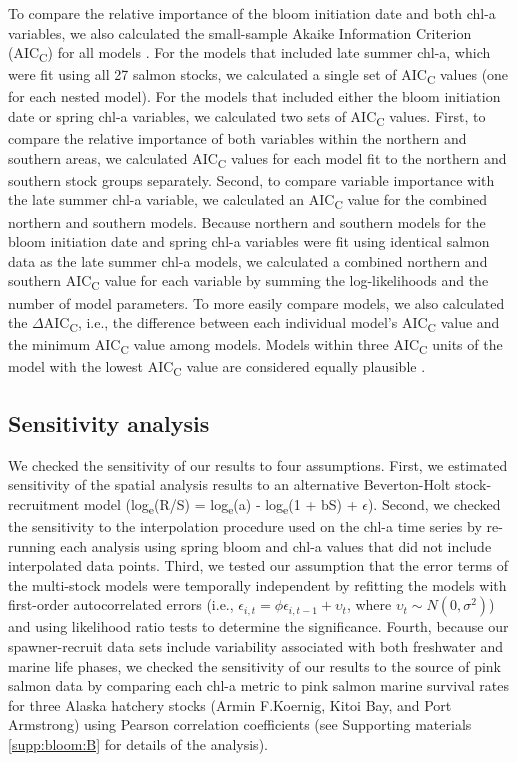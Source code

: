 To compare the relative importance of the bloom initiation date and both chl-a
variables, we also calculated the small-sample Akaike Information Criterion
(AIC\textsubscript{C}) for all models \citep{Hurvich1989a, Burnham2002a}. For
the models that included late summer chl-a, which were fit using all 27 salmon
stocks, we calculated a single set of AIC\textsubscript{C} values (one for each
nested model).  For the models that included either the bloom initiation date or
spring chl-a variables, we calculated two sets of AIC\textsubscript{C} values.
First, to compare the relative importance of both variables within the northern
and southern areas, we calculated AIC\textsubscript{C} values for each model fit
to the northern and southern stock groups separately.  Second, to compare
variable importance with the late summer chl-a variable, we calculated an
AIC\textsubscript{C} value for the combined northern and southern models.
Because northern and southern models for the bloom initiation date and spring
chl-a variables were fit using identical salmon data as the late summer chl-a
models, we calculated a combined northern and southern AIC\textsubscript{C}
value for each variable by summing the log-likelihoods and the number of model
parameters. To more easily compare models, we also calculated the
\(\Delta\)AIC\textsubscript{C}, i.e., the difference between each individual
model's AIC\textsubscript{C} value and the minimum AIC\textsubscript{C} value
among models. Models within three AIC\textsubscript{C} units of the model with
the lowest AIC\textsubscript{C} value are considered equally plausible
\citep{Burnham2002a}.


\subsection{Sensitivity analysis}

We checked the sensitivity of our results to four assumptions. First, we
estimated sensitivity of the spatial analysis results to an alternative
Beverton-Holt stock-recruitment model \citep{Beverton1957a}
(log\textsubscript{e}(R/S) = log\textsubscript{e}(a) - log\textsubscript{e}(1 +
bS) + \(\epsilon\)). Second, we checked the sensitivity to the interpolation
procedure used on the chl-a time series by re-running each analysis using spring
bloom and chl-a values that did not include interpolated data points. Third, we
tested our assumption that the error terms of the multi-stock models were
temporally independent by refitting the models with first-order autocorrelated
errors (i.e., \(\epsilon_{i,t} = \phi\epsilon_{i,t-1} + \upsilon_t\), where
\(\upsilon_t \sim N(0, \sigma^2)\)) and using likelihood ratio tests to
determine the significance. Fourth, because our spawner-recruit data sets
include variability associated with both freshwater and marine life phases, we
checked the sensitivity of our results to the source of pink salmon data by
comparing each chl-a metric to pink salmon marine survival rates for three
Alaska hatchery stocks (Armin F.Koernig, Kitoi Bay, and Port Armstrong) using
Pearson correlation coefficients (see Supporting materials \ref{supp:bloom:B} for details of
the analysis).


